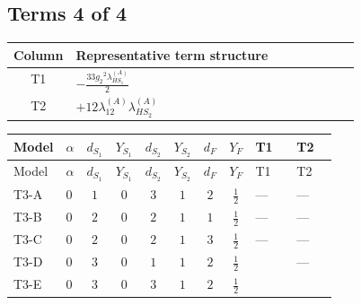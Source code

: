 \documentclass[8pt]{article}
\begin{document}
\begin{landscape}
\subsection*{Terms 4 of 4}
\begin{center}
\begin{tabular}{@{}c >{\raggedright\arraybackslash}p{0.82\linewidth}@{}}
\toprule
Column & Representative term structure \\
\midrule
T1 & \(\displaystyle -\frac{33 {g_2}^2 {\lambda_{HS_1}^{(A)}}}{2}\) \\
\midrule
T2 & \(\displaystyle +12 {\lambda_{12}^{(A)}} {\lambda_{HS_2}^{(A)}}\) \\
\midrule
\bottomrule
\end{tabular}
\end{center}
\smallskip
\tiny
\begin{longtable}{@{}llcccccc >{\raggedright\arraybackslash}p{0.21\linewidth} >{\raggedright\arraybackslash}p{0.21\linewidth}@{}}
\toprule
Model & $\alpha$ & $d_{S_1}$ & $Y_{S_1}$ & $d_{S_2}$ & $Y_{S_2}$ & $d_F$ & $Y_F$ & T1 & T2 \\
\midrule
\endfirsthead
\toprule
Model & $\alpha$ & $d_{S_1}$ & $Y_{S_1}$ & $d_{S_2}$ & $Y_{S_2}$ & $d_F$ & $Y_F$ & T1 & T2 \\
\midrule
\endhead
T3-A & $0$ & $1$ & $0$ & $3$ & $1$ & $2$ & $\frac{1}{2}$ & --- & --- \\
\midrule
T3-B & $0$ & $2$ & $0$ & $2$ & $1$ & $1$ & $\frac{1}{2}$ & --- & --- \\
\midrule
T3-C & $0$ & $2$ & $0$ & $2$ & $1$ & $3$ & $\frac{1}{2}$ & --- & --- \\
\midrule
T3-D & $0$ & $3$ & $0$ & $1$ & $1$ & $2$ & $\frac{1}{2}$ & \scriptsize\adjustbox{max width=\linewidth}{$\begin{gathered} -\frac{33 {g_2}^2 {\lambda_{HS_1}^{(A)}}}{2}\end{gathered}$} & --- \\
\midrule
T3-E & $0$ & $3$ & $0$ & $3$ & $1$ & $2$ & $\frac{1}{2}$ & \scriptsize\adjustbox{max width=\linewidth}{$\begin{gathered} -\frac{33 {g_2}^2 {\lambda_{HS_1}^{(A)}}}{2}\end{gathered}$} & \scriptsize\adjustbox{max width=\linewidth}{$\begin{gathered} +12 {\lambda_{12}^{(A)}} {\lambda_{HS_2}^{(A)}}\end{gathered}$} \\
\midrule
\bottomrule
\end{longtable}
\clearpage

\end{landscape}
\end{document}
